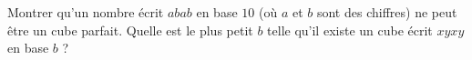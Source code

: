 Montrer qu'un nombre écrit $abab$ en base $10$ (où $a$ et $b$ sont des chiffres) ne peut être un cube parfait. Quelle est le plus petit $b$ telle qu'il existe un cube écrit $xyxy$ en base $b$ ?

